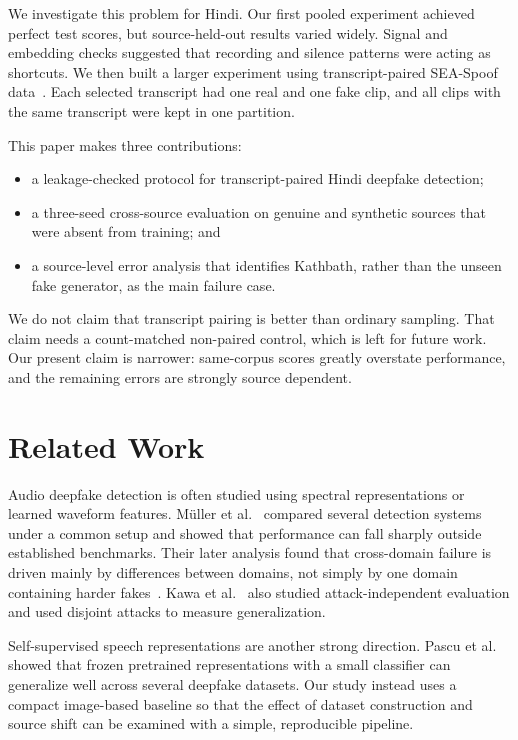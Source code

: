 \documentclass[conference]{IEEEtran}
\begin{document}
We investigate this problem for Hindi. Our first pooled experiment achieved
perfect test scores, but source-held-out results varied widely. Signal and
embedding checks suggested that recording and silence patterns were acting
as shortcuts. We then built a larger experiment using transcript-paired
SEA-Spoof data~\cite{wu2025seaspoof}. Each selected transcript had one real
and one fake clip, and all clips with the same transcript were kept in one
partition.

This paper makes three contributions:
\begin{itemize}
    \item a leakage-checked protocol for transcript-paired Hindi deepfake
    detection;
    \item a three-seed cross-source evaluation on genuine and synthetic
    sources that were absent from training; and
    \item a source-level error analysis that identifies Kathbath, rather
    than the unseen fake generator, as the main failure case.
\end{itemize}

We do not claim that transcript pairing is better than ordinary sampling.
That claim needs a count-matched non-paired control, which is left for future
work. Our present claim is narrower: same-corpus scores greatly overstate
performance, and the remaining errors are strongly source dependent.

\section{Related Work}
Audio deepfake detection is often studied using spectral representations or
learned waveform features. Müller et al.~\cite{muller2022generalize} compared
several detection systems under a common setup and showed that performance
can fall sharply outside established benchmarks. Their later analysis found
that cross-domain failure is driven mainly by differences between domains,
not simply by one domain containing harder fakes~\cite{muller2024harder}.
Kawa et al.~\cite{kawa2022attack} also studied attack-independent evaluation
and used disjoint attacks to measure generalization.

Self-supervised speech representations are another strong direction. Pascu
et al.~\cite{pascu2024calibrated} showed that frozen pretrained
representations with a small classifier can generalize well across several
deepfake datasets. Our study instead uses a compact image-based baseline so
that the effect of dataset construction and source shift can be examined
with a simple, reproducible pipeline.
\end{document}
